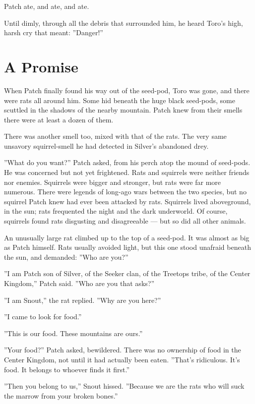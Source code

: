 \documentclass[12pt]{book}
\begin{document}
Patch ate, and ate, and ate.

Until dimly, through all the debris that surrounded him, he heard Toro's high, harsh cry that meant: ''Danger!''


\section{A Promise}

When Patch finally found his way out of the seed-pod, Toro was gone, and there were rats all around him. Some hid beneath the huge black seed-pods, some scuttled in the shadows of the nearby mountain. Patch knew from their smells there were at least a dozen of them.

There was another smell too, mixed with that of the rats. The very same unsavory squirrel-smell he had detected in Silver's abandoned drey.

''What do you want?'' Patch asked, from his perch atop the mound of seed-pods. He was concerned but not yet frightened. Rats and squirrels were neither friends nor enemies. Squirrels were bigger and stronger, but rats were far more numerous. There were legends of long-ago wars between the two species, but no squirrel Patch knew had ever been attacked by rats. Squirrels lived aboveground, in the sun; rats frequented the night and the dark underworld. Of course, squirrels found rats disgusting and disagreeable ---
but so did all other animals.

An unusually large rat climbed up to the top of a seed-pod. It was almost as big as Patch himself. Rats usually avoided light, but this one stood unafraid beneath the sun, and demanded: ''Who are you?''

''I am Patch son of Silver, of the Seeker clan, of the Treetops tribe, of the Center Kingdom,'' Patch said. ''Who are you that asks?''

''I am Snout,'' the rat replied. ''Why are you here?''

''I came to look for food.''

''This is our food. These mountains are ours.''

''Your food?'' Patch asked, bewildered. There was no ownership of food in the Center Kingdom, not until it had actually been eaten. ''That's ridiculous. It's food. It belongs to whoever finds it first.''

''Then you belong to us,'' Snout hissed. ''Because we are the rats who will suck the marrow from your broken bones.''
\end{document}
